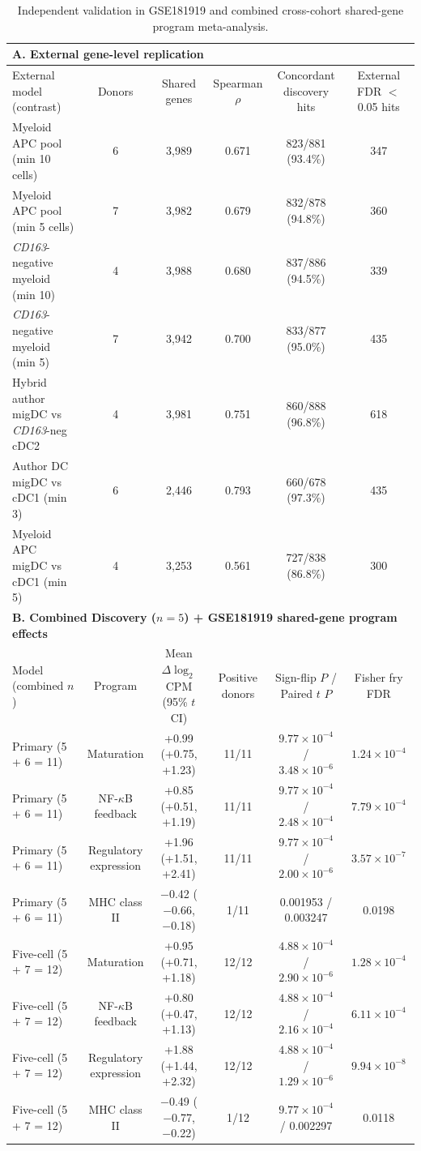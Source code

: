 \documentclass[11pt,a4paper]{article}
\begin{document}
\begin{table}[htbp]
\centering
\caption{Independent validation in GSE181919 and combined cross-cohort shared-gene program meta-analysis.}
\scriptsize
\begin{tabular}{lccccc}
\toprule
\multicolumn{6}{l}{\textbf{A. External gene-level replication}} \\
\midrule
External model (contrast) & Donors & Shared genes & Spearman $\rho$ & Concordant discovery hits & External FDR $<$ 0.05 hits \\
\midrule
Myeloid APC pool (min 10 cells) & 6 & 3,989 & 0.671 & 823/881 (93.4\%) & 347 \\
Myeloid APC pool (min 5 cells) & 7 & 3,982 & 0.679 & 832/878 (94.8\%) & 360 \\
\textit{CD163}-negative myeloid (min 10) & 4 & 3,988 & 0.680 & 837/886 (94.5\%) & 339 \\
\textit{CD163}-negative myeloid (min 5) & 7 & 3,942 & 0.700 & 833/877 (95.0\%) & 435 \\
Hybrid author migDC vs \textit{CD163}-neg cDC2 & 4 & 3,981 & 0.751 & 860/888 (96.8\%) & 618 \\
Author DC migDC vs cDC1 (min 3) & 6 & 2,446 & 0.793 & 660/678 (97.3\%) & 435 \\
Myeloid APC migDC vs cDC1 (min 5) & 4 & 3,253 & 0.561 & 727/838 (86.8\%) & 300 \\
\midrule
\multicolumn{6}{l}{\textbf{B. Combined Discovery ($n=5$) + GSE181919 shared-gene program effects}} \\
\midrule
Model (combined $n$) & Program & Mean $\Delta \log_2$ CPM (95\% $t$ CI) & Positive donors & Sign-flip $P$ / Paired $t$ $P$ & Fisher fry FDR \\
\midrule
Primary (5 + 6 = 11) & Maturation & +0.99 (+0.75, +1.23) & 11/11 & $9.77 \times 10^{-4}$ / $3.48 \times 10^{-6}$ & $1.24 \times 10^{-4}$ \\
Primary (5 + 6 = 11) & NF-$\kappa$B feedback & +0.85 (+0.51, +1.19) & 11/11 & $9.77 \times 10^{-4}$ / $2.48 \times 10^{-4}$ & $7.79 \times 10^{-4}$ \\
Primary (5 + 6 = 11) & Regulatory expression & +1.96 (+1.51, +2.41) & 11/11 & $9.77 \times 10^{-4}$ / $2.00 \times 10^{-6}$ & $3.57 \times 10^{-7}$ \\
Primary (5 + 6 = 11) & MHC class II & $-$0.42 ($-$0.66, $-$0.18) & 1/11 & 0.001953 / 0.003247 & 0.0198 \\
Five-cell (5 + 7 = 12) & Maturation & +0.95 (+0.71, +1.18) & 12/12 & $4.88 \times 10^{-4}$ / $2.90 \times 10^{-6}$ & $1.28 \times 10^{-4}$ \\
Five-cell (5 + 7 = 12) & NF-$\kappa$B feedback & +0.80 (+0.47, +1.13) & 12/12 & $4.88 \times 10^{-4}$ / $2.16 \times 10^{-4}$ & $6.11 \times 10^{-4}$ \\
Five-cell (5 + 7 = 12) & Regulatory expression & +1.88 (+1.44, +2.32) & 12/12 & $4.88 \times 10^{-4}$ / $1.29 \times 10^{-6}$ & $9.94 \times 10^{-8}$ \\
Five-cell (5 + 7 = 12) & MHC class II & $-$0.49 ($-$0.77, $-$0.22) & 1/12 & $9.77 \times 10^{-4}$ / 0.002297 & 0.0118 \\
\bottomrule
\end{tabular}
\end{table}
\end{document}
